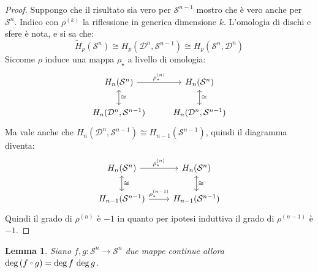 \documentclass[10pt, toc=sectionentrywithdots]{scrartcl}
\newcounter{lemmac}
\newtheorem{lemma}[lemmac]{Lemma}
\newcommand{\Sph}[1][]{\mathcal{S}^#1}
\newcommand{\Disk}[1][]{\mathcal{D}^#1}
\let\latexcirc=\circ
\newcommand{\ccirc}{\mathbin{\mathchoice
  {\xcirc\scriptstyle}
  {\xcirc\scriptstyle}
  {\xcirc\scriptscriptstyle}
  {\xcirc\scriptscriptstyle}
}}
\newcommand{\xcirc}[1]{\vcenter{\hbox{$#1\latexcirc$}}}
\let\circ\ccirc
\begin{document}
\begin{proof}
  Suppongo che il risultato sia vero per $ \Sph{n-1} $ mostro che è vero anche per $ \Sph{n} $.
  Indico con $ \rho^{(k)} $ la riflessione in generica dimensione $ k $.
  \noindent
  L'omologia di dischi e sfere è nota, e si sa che:
  \[
    \tilde{H}_p(\Sph{n}) \cong H_p(\Disk{n}, \Sph{n-1}) \cong H_p(\Sph{n}, \Disk{n})
  \]
  Siccome $ \rho $ induce una mappa $ \rho_\star $ a livello di omologia:
  \[
    \begin{tikzcd}
      H_n(\Sph{n}) \rar{\rho^{(n)}_\star} \arrow[leftrightarrow]{d}{\cong} & H_n(\Sph{n})  \arrow[leftrightarrow]{d}{\cong} \\
      H_n(\Disk{n}, \Sph{n-1}) &  H_n(\Disk{n}, \Sph{n-1})
    \end{tikzcd}
  \]
  Ma vale anche che $ H_n(\Disk{n}, \Sph{n-1}) \cong H_{n-1}(\Sph{n-1}) $, quindi il diagramma diventa:
  \[
    \begin{tikzcd}
      H_n(\Sph{n}) \rar{\rho^{(n)}_\star} \arrow[leftrightarrow]{d}{\cong} & H_n(\Sph{n})  \arrow[leftrightarrow]{d}{\cong} \\
      H_{n-1}(\Sph{n-1}) \rar{\rho_\star^{(n-1)}} &  H_{n-1}(\Sph{n-1})
    \end{tikzcd}
  \]
  Quindi il grado di $ \rho^{(n)} $ è $ - 1 $ in quanto per ipotesi induttiva il grado di $ \rho^{(n-1)} $ è $ - 1 $.
\end{proof}
\begin{lemma}
  \label{lemma:composizione_grado}
  Siano $ f,g \colon \Sph{n} \to \Sph{n} $ due mappe continue allora
  $ \deg {(f \circ g)} = \deg{f} \, \deg{g} $.
\end{lemma}
\end{document}
